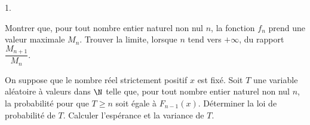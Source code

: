 \documentclass[11pt]{article}%
\begin{document}
\begin{noliste}{1.}
\item Montrer que, pour tout nombre entier naturel non nul $n$, la
fonction $f_{n}$ prend une valeur maximale $M_{n}$. Trouver la limite,
lorsque $n$
tend vers $ + \infty $, du rapport $\dfrac{M_{n + 1}}{M_{n}}.$

\item On suppose que le nombre réel strictement positif $x$ est fixé.
Soit $T
$ une variable aléatoire à valeurs dans $\N$ telle que, pour tout
nombre entier naturel non nul $n$, la probabilité pour que $T\geq n$
soit égale à $F_{n-1}(x)$. Déterminer la loi de probabilité de $T$.
Calculer
l'espérance et la variance de $T$.
\end{noliste}

\label{fin}
\end{document}
